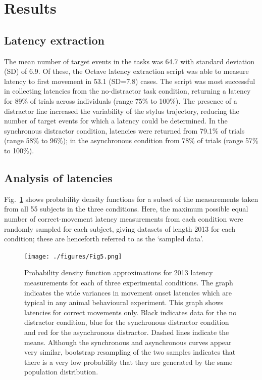 \documentclass[10pt,letterpaper]{article}
\begin{document}

\section*{Results}

\subsection*{Latency extraction}

The mean number of target events in the tasks was 64.7 with standard
deviation (SD) of 6.9. Of these, the Octave latency extraction script
was able to measure latency to first movement in 53.1 (SD=7.8)
cases. The script was most successful in collecting latencies from the
no-distractor task condition, returning a latency for 89\% of trials
across individuals (range 75\% to 100\%). The presence of a distractor
line increased the variability of the stylus trajectory, reducing the
number of target events for which a latency could be determined. In
the synchronous distractor condition, latencies were returned from
79.1\% of trials (range 58\% to 96\%); in the asynchronous condition
from 78\% of trials (range 57\% to 100\%).

\subsection*{Analysis of latencies}

Fig.~\ref{data_density} shows probability density functions for a
subset of the measurements taken from all 55 subjects in the three
conditions. Here, the maximum possible equal number of
correct-movement latency measurements from each condition were
randomly sampled for each subject, giving datasets of length 2013 for
each condition; these are henceforth referred to as the `sampled
data'. %

\begin{figure}[htb!]
\centering
\texttt{[image: ./figures/Fig5.png]} %
\caption[Latency measurement PDF] {Probability density function
  approximations for 2013 latency measurements for each of three
  experimental conditions. The graph indicates the wide variances in
  movement onset latencies which are typical in any animal behavioural
  experiment. This graph shows latencies for correct movements
  only. Black indicates data for the no distractor condition, blue for
  the synchronous distractor condition and red for the asynchronous
  distractor. Dashed lines indicate the means. Although the
  synchronous and asynchronous curves appear very similar, bootstrap
  resampling of the two samples indicates that there is a very low
  probability that they are generated by the same population
  distribution.}
\label{data_density}
\end{figure}
\end{document}

